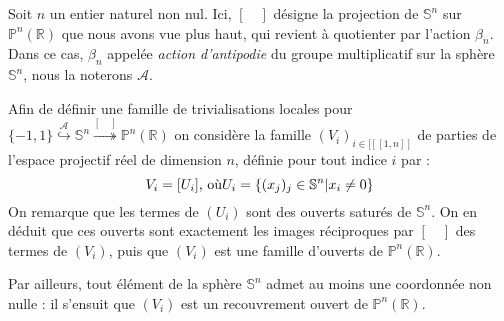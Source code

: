 \begin{exem}
Soit $n$ un entier naturel non nul. Ici, $[\quad]$ d\'esigne la projection de $\mathbb{S}^n$ sur $\mathbb{P}^n(\mathbb{R})$ que nous avons vue plus haut, %
qui revient \`a quotienter par l'action $\beta_n$. %
Dans ce cas, $\beta_n$ appelée \textit{action d'antipodie} du groupe multiplicatif sur la sph\`ere $\mathbb{S}^n$, nous la noterons $\mathcal{A}$.

\medskip
Afin de d\'efinir une famille de trivialisations locales pour %
$\{-1,1\} \overset{\mathcal{A}}{\hookrightarrow} \mathbb{S}^n \overset{[\quad ]}{\twoheadrightarrow} \mathbb{P}^n(\mathbb{R})$ %
on considère la famille $(V_i)_{i \in [\![[1,n]\!]}$ de parties de l'espace projectif réel de dimension $n$, définie pour tout indice $i$ par :
\[V_i = [U_i] \text{, o\`u} U_i = \{(x_j)_j \in \mathbb{S}^n | x_i \neq 0\}\]
On remarque que les termes de $(U_i)$ sont des ouverts satur\'es de $\mathbb{S}^n$. %
On en d\'eduit que ces ouverts sont exactement les images r\'eciproques par $[\quad]$ des termes de $(V_i)$, %
puis que $(V_i)$ est une famille d'ouverts de $\mathbb{P}^n(\mathbb{R})$.
\par
Par ailleurs, tout \'el\'ement de la sph\`ere $\mathbb{S}^n$ admet au moins une coordonn\'ee non nulle : %
il s'ensuit que $(V_i)$ est un recouvrement ouvert de $\mathbb{P}^n(\mathbb{R})$.


\end{exem}
